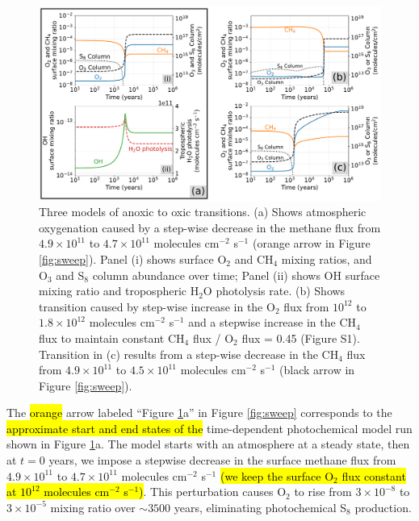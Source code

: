 \documentclass[9pt,twocolumn,twoside,lineno]{pnas-new}
\begin{document}
\begin{figure}
    \centering
    \includegraphics[width=\textwidth]{Oxygenation.pdf}
    \caption{Three models of anoxic to oxic transitions. (a) Shows atmospheric oxygenation caused by a step-wise decrease in the methane flux from $4.9 \times 10^{11}$ to $4.7 \times 10^{11}$ molecules cm$^{-2}$ s$^{-1}$ (orange arrow in Figure \ref{fig:sweep}). Panel (i) shows surface O$_2$ and CH$_4$ mixing ratios, and O$_3$ and S$_8$ column abundance over time; Panel (ii) shows OH surface mixing ratio and tropospheric H$_2$O photolysis rate. (b) Shows transition caused by step-wise increase in the O$_2$ flux from $10^{12}$ to $1.8 \times 10^{12}$ molecules cm$^{-2}$ s$^{-1}$ and a stepwise increase in the CH$_4$ flux to maintain constant CH$_4$ flux / O$_2$ flux = 0.45 (Figure S1). Transition in (c) results from a step-wise decrease in the CH$_4$ flux from $4.9 \times 10^{11}$ to $4.5 \times 10^{11}$ molecules cm$^{-2}$ s$^{-1}$ (black arrow in Figure \ref{fig:sweep}).}
    \label{fig:oxygenation}
\end{figure}

The \hl{orange} arrow labeled ``Figure \ref{fig:oxygenation}a'' in Figure \ref{fig:sweep} corresponds to the \hl{approximate start and end states of the} time-dependent photochemical model run shown in Figure \ref{fig:oxygenation}a. The model starts with an atmosphere at a steady state, then at $t = 0$ years, we impose a stepwise decrease in the surface methane flux from $4.9 \times 10^{11}$ to $4.7 \times 10^{11}$ molecules cm$^{-2}$ s$^{-1}$ \hl{(we keep the surface O$_2$ flux constant at $10^{12}$ molecules cm$^{-2}$ s$^{-1}$)}. This perturbation causes O$_2$ to rise from $3 \times 10^{-8}$ to $3 \times 10^{-5}$ mixing ratio over $\sim 3500$ years, eliminating photochemical S$_8$ production. 
\end{document}
